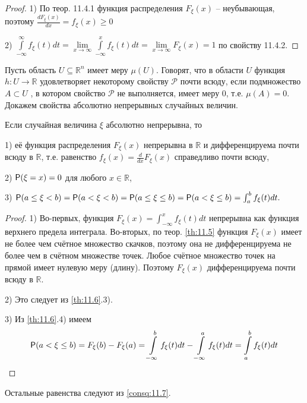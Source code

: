 \begin{proof}

1) По теор. 11.4.1 функция распределения $F_{\xi}(x)$ -- неубывающая, поэтому $\frac{dF_{\xi}(x)}{dx}=f_{\xi}(x) \geq 0$

2) $\int\limits_{-\infty}^{\infty}f_{\xi}(t)dt = \lim\limits_{x \to \infty}\int\limits_{-\infty}^{x}f_{\xi}(t)dt = \lim\limits_{x \to \infty}F_{\xi}(x) = 1$ по свойству 11.4.2.
\end{proof} 

\begin{definition}
 \label{def:12.4}

Пусть область $U \subseteq \mathbb{R}^n$ имеет меру $\mu(U )$. Говорят, что в области $U$ функция $h : U \to \mathbb{R}$ удовлетворяет некоторому свойству $\mathcal{P}$ почти всюду, если подмножество $A \subset U$ , в котором свойство $\mathcal{P}$ не выполняется, имеет меру 0, т.е. $\mu(A) = 0$.
Докажем свойства абсолютно непрерывных случайных величин.
\end{definition}

\begin{theorem}
 \label{th:12.5}

Если случайная величина $\xi$ абсолютно непрерывна, то

1) её функция распределения $F_{\xi}(x)$ непрерывна в $\mathbb{R}$ и дифференцируема почти всюду в $\mathbb{R}$, т.е. равенство $f_{\xi}(x) = \frac{d}{dx}F_{\xi}(x)$ справедливо почти всюду,

2) $\P(\xi = x) = 0$ для любого $x \in \mathbb{R}$,

3) $\P(a \leq \xi < b) = \P(a < \xi < b) = \P(a \leq \xi \leq b) = \P(a < \xi \leq b) = \int_{a}^{b}f_{\xi}(t)dt.$
\end{theorem}

\begin{proof}
1) Во-первых, функция $F_{\xi}(x) = \int_{-\infty}^{x}f_{\xi}(t)dt$ непрерывна как функция верхнего предела интеграла.
Во-вторых, по теор. \ref{th:11.5} функция $F_{\xi}(x)$ имеет не более чем счётное множество скачков, поэтому она не дифференцируема не более чем в счётном
множестве точек. Любое счётное множество точек на прямой имеет нулевую меру (длину). Поэтому $F_{\xi}(x)$ дифференцируема почти всюду в $\mathbb{R}$.

2) Это следует из \ref{th:11.6}.3).

3) Из \ref{th:11.6}.4) имеем
$$\P(a < \xi \leq b) = F_{\xi}(b) - F_{\xi}(a) = \int\limits_{-\infty}^{b}f_{\xi}(t)dt - \int\limits_{-\infty}^{a}f_{\xi}(t)dt = \int\limits_{a}^{b}f_{\xi}(t)dt$$

\end{proof}
Остальные равенства следуют из \ref{consq:11.7}.


